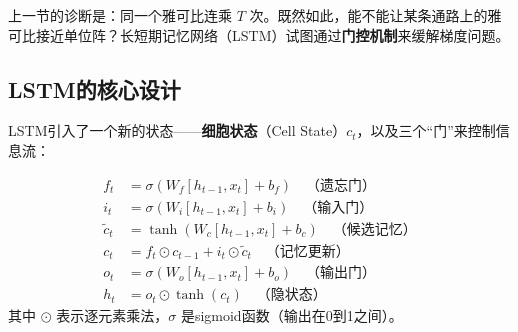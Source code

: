 
上一节的诊断是：同一个雅可比连乘 $T$ 次。既然如此，能不能让某条通路上的雅可比接近单位阵？长短期记忆网络（LSTM）试图通过\textbf{门控机制}来缓解梯度问题。

\subsection{LSTM的核心设计}

LSTM引入了一个新的状态——\textbf{细胞状态}（Cell State）$c_t$，以及三个“门”来控制信息流：

\begin{keyformula}[title=LSTM方程]
\begin{align}
    f_t &= \sigma(W_f [h_{t-1}, x_t] + b_f) \quad \text{（遗忘门）} \\
    i_t &= \sigma(W_i [h_{t-1}, x_t] + b_i) \quad \text{（输入门）} \\
    \tilde{c}_t &= \tanh(W_c [h_{t-1}, x_t] + b_c) \quad \text{（候选记忆）} \\
    c_t &= f_t \odot c_{t-1} + i_t \odot \tilde{c}_t \quad \text{（记忆更新）} \\
    o_t &= \sigma(W_o [h_{t-1}, x_t] + b_o) \quad \text{（输出门）} \\
    h_t &= o_t \odot \tanh(c_t) \quad \text{（隐状态）}
\end{align}
其中 $\odot$ 表示逐元素乘法，$\sigma$ 是sigmoid函数（输出在0到1之间）。
\end{keyformula}

